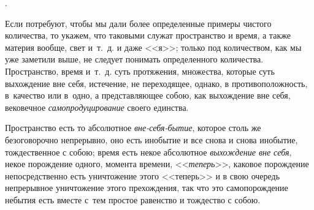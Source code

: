 \vspace{3mm}

.

Если потребуют, чтобы мы дали более определенные примеры чистого количества,
то укажем, что таковыми служат пространство и время, а также материя
вообще, свет и~т.~д. и даже <<я>>; только под количеством, как мы уже
заметили выше, не следует понимать определенного количества. Пространство,
время и~т.~д. суть протяжения, множества, которые суть выхождение вне себя,
истечение, не переходящее, однако, в противоположность, в~качество или
в~одно, а представляющее собою, как выхождение вне себя, вековечное
{\em самопродуцирование} своего единства.

Пространство есть то абсолютное {\em вне-себя-бытие}, которое столь же
безоговорочно непрерывно, оно есть инобытие и все снова и снова инобытие,
тождественное с собою; время есть некое абсолютное {\em выхождение вне себя},
некое порождение одного, момента времени, <<{\em теперь}>>, каковое порождение
непосредственно есть уничтожение этого <<теперь>> и в свою очередь непрерывное
уничтожение этого прехождения, так что это самопорождение небытия есть вместе
с~тем простое равенство и тождество с собою.

